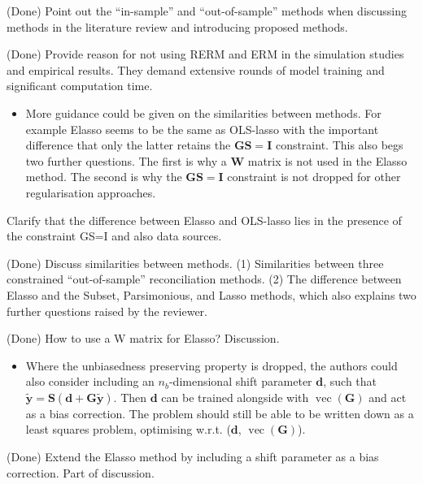 \documentclass[11pt,a4paper,]{article}
\providecommand{\tightlist}{%
  \setlength{\itemsep}{0pt}\setlength{\parskip}{0pt}}
\renewenvironment{quote}
               {\list{}{\rightmargin\leftmargin}%
                \item\relax\color[RGB]{0,150,0}}
               {\endlist}
\begin{document}
\begin{quote}
(Done) Point out the ``in-sample'' and ``out-of-sample'' methods when
discussing methods in the literature review and introducing proposed
methods.

(Done) Provide reason for not using RERM and ERM in the simulation
studies and empirical results. They demand extensive rounds of model
training and significant computation time.
\end{quote}

\begin{itemize}
\tightlist
\item
  More guidance could be given on the similarities between methods. For
  example Elasso seems to be the same as OLS-lasso with the important
  difference that only the latter retains the \(\bm{GS}=\bm{I}\)
  constraint. This also begs two further questions. The first is why a
  \(\bm{W}\) matrix is not used in the Elasso method. The second is why
  the \(\bm{GS}=\bm{I}\) constraint is not dropped for other
  regularisation approaches.
\end{itemize}

\begin{quote}
Clarify that the difference between Elasso and OLS-lasso lies in the
presence of the constraint GS=I and also data sources.

(Done) Discuss similarities between methods. (1) Similarities between
three constrained ``out-of-sample'' reconciliation methods. (2) The
difference between Elasso and the Subset, Parsimonious, and Lasso
methods, which also explains two further questions raised by the
reviewer.

(Done) How to use a W matrix for Elasso? Discussion.
\end{quote}

\begin{itemize}
\tightlist
\item
  Where the unbiasedness preserving property is dropped, the authors
  could also consider including an \(n_b\)-dimensional shift parameter
  \(\bm{d}\), such that
  \(\tilde{\bm{y}}=\bm{S}(\bm{d}+\bm{G}\tilde{\bm{y}})\). Then
  \(\bm{d}\) can be trained alongside with
  \(\operatorname{vec}(\bm{G})\) and act as a bias correction. The
  problem should still be able to be written down as a least squares
  problem, optimising w.r.t. (\(\bm{d}\),
  \(\operatorname{vec}(\bm{G})\)).
\end{itemize}

\begin{quote}
(Done) Extend the Elasso method by including a shift parameter as a bias
correction. Part of discussion.
\end{quote}
\end{document}
